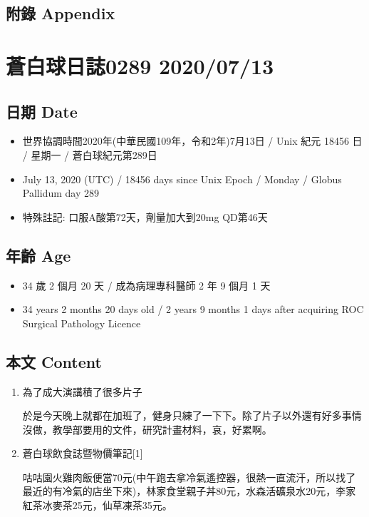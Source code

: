 \documentclass[
]{article}
\providecommand{\tightlist}{%
  \setlength{\itemsep}{0pt}\setlength{\parskip}{0pt}}
\begin{document}
\hypertarget{ux9644ux9304-appendix-10}{%
\subsection{附錄 Appendix}\label{ux9644ux9304-appendix-10}}

\hypertarget{ux84bcux767dux7403ux65e5ux8a8c0289-20200713}{%
\section{蒼白球日誌0289
2020/07/13}\label{ux84bcux767dux7403ux65e5ux8a8c0289-20200713}}

\hypertarget{ux65e5ux671f-date-11}{%
\subsection{日期 Date}\label{ux65e5ux671f-date-11}}

\begin{itemize}
\tightlist
\item
  世界協調時間2020年(中華民國109年，令和2年)7月13日 / Unix 紀元 18456 日
  / 星期一 / 蒼白球紀元第289日
\item
  July 13, 2020 (UTC) / 18456 days since Unix Epoch / Monday / Globus
  Pallidum day 289
\item
  特殊註記: 口服A酸第72天，劑量加大到20mg QD第46天
\end{itemize}

\hypertarget{ux5e74ux9f61-age-11}{%
\subsection{年齡 Age}\label{ux5e74ux9f61-age-11}}

\begin{itemize}
\tightlist
\item
  34 歲 2 個月 20 天 / 成為病理專科醫師 2 年 9 個月 1 天
\item
  34 years 2 months 20 days old / 2 years 9 months 1 days after
  acquiring ROC Surgical Pathology Licence
\end{itemize}

\hypertarget{ux672cux6587-content-11}{%
\subsection{本文 Content}\label{ux672cux6587-content-11}}

\begin{enumerate}
\def\labelenumi{\arabic{enumi}.}
\item
  為了成大演講積了很多片子

  於是今天晚上就都在加班了，健身只練了一下下。除了片子以外還有好多事情沒做，教學部要用的文件，研究計畫材料，哀，好累啊。
\item
  蒼白球飲食誌暨物價筆記{[}1{]}

  咕咕園火雞肉飯便當70元(中午跑去拿冷氣遙控器，很熱一直流汗，所以找了最近的有冷氣的店坐下來)，林家食堂親子丼80元，水森活礦泉水20元，李家紅茶冰麥茶25元，仙草凍茶35元。
\end{enumerate}
\end{document}
